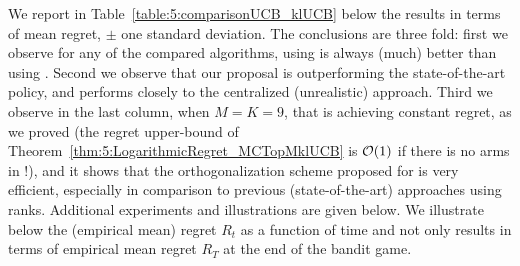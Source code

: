We report in Table~\ref{table:5:comparisonUCB_klUCB} below the results in terms of mean regret, $\pm$ one standard deviation.
The conclusions are three fold: first we observe for any of the compared algorithms, using \klUCB{} is always (much) better than using \UCB.
Second we observe that our proposal \MCTopM{} is outperforming the state-of-the-art \RhoRand{} policy, and performs closely to the centralized (unrealistic) approach.
Third we observe in the last column, when $M=K=9$, that \MCTopM{} is achieving constant regret, as we proved (the regret upper-bound of Theorem~\ref{thm:5:LogarithmicRegret_MCTopMklUCB} is $\mathcal{O}(1)$ if there is no arms in \Mworst{} !), and it shows that the orthogonalization scheme proposed for \MCTopM{} is very efficient, especially in comparison to previous (state-of-the-art) approaches using ranks.
%
Additional experiments and illustrations are given below.
We illustrate below the (empirical mean) regret $R_t$ as a function of time and not only results in terms of empirical mean regret $R_T$ at the end of the bandit game.

